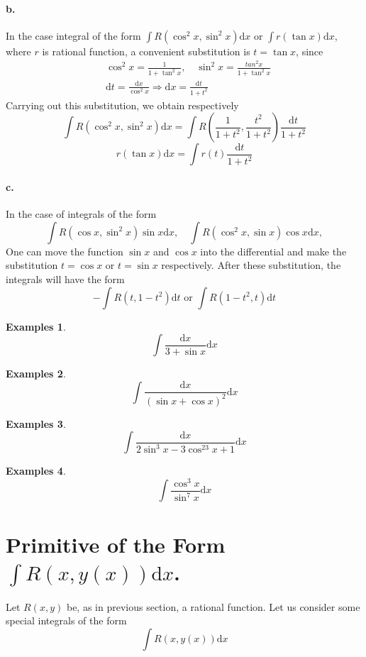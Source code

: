 \documentclass[a4paper,12pt]{article} %
\newtheorem{example}{Examples}
\begin{document}
\paragraph{\rm \textbf{b.}} In the case integral of the form $ \displaystyle 
\int R(\cos^2x, \sin^2x)\mathrm{d}x$ or $\displaystyle \int r(\tan x)\mathrm{d}x$, 
where $r$ is rational function, a convenient substitution is $t = \tan x$, since 
\[
    \begin{split}
        &\cos^2x = \frac{1}{1 + \tan^2x}, \quad \sin^2x = \frac{tan^2x}{1 + \tan^2x}\\
        &\mathrm{d}t = \frac{\mathrm{d}x}{\cos^2x} \Rightarrow \mathrm{d}x = \frac{\mathrm{d}t}
        {1 + t^2}
    \end{split}
    \]
Carrying out this substitution, we obtain respectively 
\[
    \int R(\cos^2x, \sin^2x)\mathrm{d}x = \int R\left(\frac{1}{1+t^2}, \frac{t^2}{1+t^2}\right)
    \frac{\mathrm{d}t}{1+t^2}
    \]
\[
    r(\tan x)\mathrm{d}x = \int r(t)\frac{\mathrm{d}t}{1 + t^2}
    \]
\paragraph{\rm \textbf{c.}} In the case of integrals of the form 
\[
    \int R(\cos x, \sin^2x)\sin x \mathrm{d}x, \quad 
    \int R(\cos^2x, \sin x)\cos x \mathrm{d}x,
    \]
One can move the function $\sin x$ and $\cos x $ into the differential 
and make the substitution $t = \cos x$ or $t = \sin x$ respectively. 
After these substitution, the integrals will have the form 
\[
    -\int R(t, 1-t^2)\mathrm{d}t \text{ or } \int R(1-t^2,t)\mathrm{d}t
    \]

\begin{example}
    \[
        \int \frac{\mathrm{d}x}{3 + \sin x}\mathrm{d}x
    \]
\end{example}

\begin{example}
    \[
        \int \frac{\mathrm{d}x}{(\sin x + \cos x)^2}\mathrm{d}x
    \]
\end{example}

\begin{example}
    \[
        \int \frac{\mathrm{d}x}{2\sin^3x - 3\cos^23x + 1}\mathrm{d}x
    \]
\end{example}

\begin{example}
    \[
        \int \frac{\cos^3x}{\sin^7x}\mathrm{d}x
    \]
\end{example}

\section{Primitive of the Form $\displaystyle \int R(x, y(x))\mathrm{d}x$.}
Let $R(x,y)$ be, as in previous section, a rational function. 
Let us consider some special integrals of the form 
\[
    \int R(x,y(x))\mathrm{d}x
    \]
\end{document}
